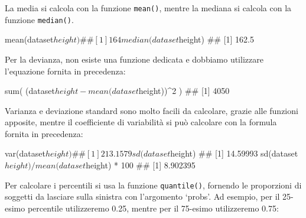 \documentclass[a4paper,12pt,oneside]{book}
\newenvironment{Shaded}{\begin{snugshade}}{\end{snugshade}}
\newcommand{\DecValTok}[1]{#1}
\newcommand{\FloatTok}[1]{#1}
\newcommand{\SpecialCharTok}[1]{#1}
\newcommand{\DocumentationTok}[1]{#1}
\newcommand{\FunctionTok}[1]{#1}
\newcommand{\AttributeTok}[1]{#1}
\newcommand{\NormalTok}[1]{#1}
\begin{document}
La media si calcola con la funzione \texttt{mean()}, mentre la mediana si calcola con la funzione \texttt{median()}.

\begin{Shaded}
\begin{Highlighting}[]
\FunctionTok{mean}\NormalTok{(dataset}\SpecialCharTok{$}\NormalTok{height)}
\DocumentationTok{\#\# [1] 164}
\FunctionTok{median}\NormalTok{(dataset}\SpecialCharTok{$}\NormalTok{height)}
\DocumentationTok{\#\# [1] 162.5}
\end{Highlighting}
\end{Shaded}

Per la devianza, non esiste una funzione dedicata e dobbiamo utilizzare l'equazione fornita in precedenza:

\begin{Shaded}
\begin{Highlighting}[]
\FunctionTok{sum}\NormalTok{( (dataset}\SpecialCharTok{$}\NormalTok{height }\SpecialCharTok{{-}} \FunctionTok{mean}\NormalTok{(dataset}\SpecialCharTok{$}\NormalTok{height))}\SpecialCharTok{\^{}}\DecValTok{2}\NormalTok{ )}
\DocumentationTok{\#\# [1] 4050}
\end{Highlighting}
\end{Shaded}

Varianza e deviazione standard sono molto facili da calcolare, grazie alle funzioni apposite, mentre il coefficiente di variabilità si può calcolare con la formula fornita in precedenza:

\begin{Shaded}
\begin{Highlighting}[]
\FunctionTok{var}\NormalTok{(dataset}\SpecialCharTok{$}\NormalTok{height)}
\DocumentationTok{\#\# [1] 213.1579}
\FunctionTok{sd}\NormalTok{(dataset}\SpecialCharTok{$}\NormalTok{height)}
\DocumentationTok{\#\# [1] 14.59993}
\FunctionTok{sd}\NormalTok{(dataset}\SpecialCharTok{$}\NormalTok{height)}\SpecialCharTok{/}\FunctionTok{mean}\NormalTok{(dataset}\SpecialCharTok{$}\NormalTok{height) }\SpecialCharTok{*} \DecValTok{100}
\DocumentationTok{\#\# [1] 8.902395}
\end{Highlighting}
\end{Shaded}

Per calcolare i percentili si usa la funzione \texttt{quantile()}, fornendo le proporzioni di soggetti da lasciare sulla sinistra con l'argomento `probs'. Ad esempio, per il 25-esimo percentile utilizzeremo 0.25, mentre per il 75-esimo utilizzeremo 0.75:

\begin{Shaded}
\end{Shaded}
\end{document}
